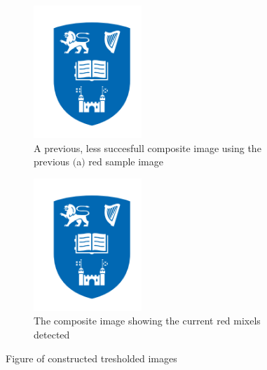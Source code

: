 \documentclass{article}
\begin{document}
\begin{figure}[H]
\begin{subfigure}{0.5\textwidth}
\includegraphics[width=0.9\linewidth, height=5cm]{logo.png} 
\caption{A previous, less succesfull composite image using the previous $($a$)$ red sample image}
\label{fig:subim1}
\end{subfigure}
\begin{subfigure}{0.5\textwidth}
\includegraphics[width=0.9\linewidth, height=5cm]{logo.png}
\caption{The composite image showing the current red mixels detected}
\label{fig:subim2}
\end{subfigure}
\caption{Figure of constructed tresholded images}
\label{fig:image2}
\end{figure}





\begin{lstlisting}

\end{lstlisting}
\end{document}
